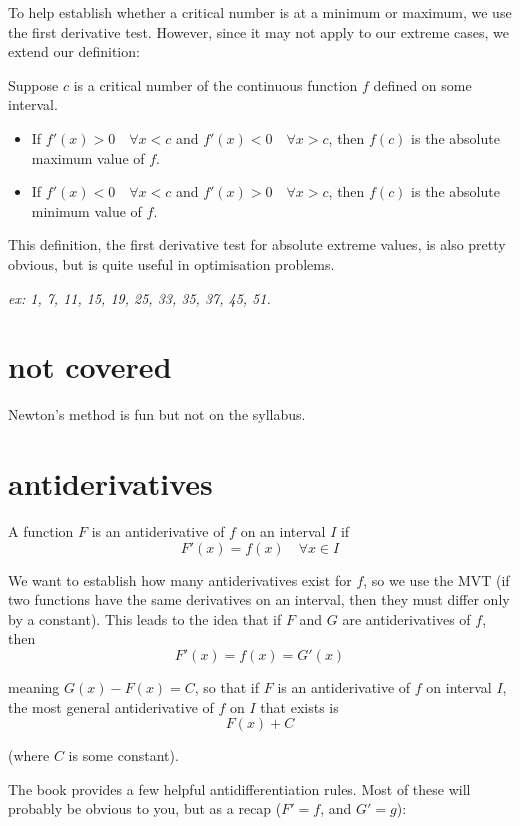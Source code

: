 \documentclass[10pt,a4paper]{report}
\begin{document}
To help establish whether a critical number is at a minimum or maximum, we use the first derivative test. However, since it may not apply to our extreme cases, we extend our definition:

Suppose $c$ is a critical number of the continuous function $f$ defined on some interval.

\begin{itemize}
	\item If $f'(x) > 0 \quad \forall x < c$ and $f'(x) < 0 \quad \forall x > c$, then $f(c)$ is the absolute maximum value of $f$.
	\item If $f'(x) < 0 \quad \forall x < c$ and $f'(x) > 0 \quad \forall x > c$, then $f(c)$ is the absolute minimum value of $f$.
\end{itemize}

This definition, the first derivative test for absolute extreme values, is also pretty obvious, but is quite useful in optimisation problems.

\emph{ex: 1, 7, 11, 15, 19, 25, 33, 35, 37, 45, 51.}

\section{not covered}

Newton's method is fun but not on the syllabus.

\section{antiderivatives}

A function $F$ is an antiderivative of $f$ on an interval $I$ if
$$
	F'(x) = f(x) \quad \forall x \in I
$$

We want to establish how many antiderivatives exist for $f$, so we use the MVT (if two functions have the same derivatives on an interval, then they must differ only by a constant). This leads to the idea that if $F$ and $G$ are antiderivatives of $f$, then
$$
	F'(x) = f(x) = G'(x)
$$

meaning $G(x) - F(x) = C$, so that if $F$ is an antiderivative of $f$ on interval $I$, the most general antiderivative of $f$ on $I$ that exists is
$$
	F(x) + C
$$

(where $C$ is some constant).

The book provides a few helpful antidifferentiation rules. Most of these will probably be obvious to you, but as a recap ($F' = f$, and $G' = g$):
\end{document}
